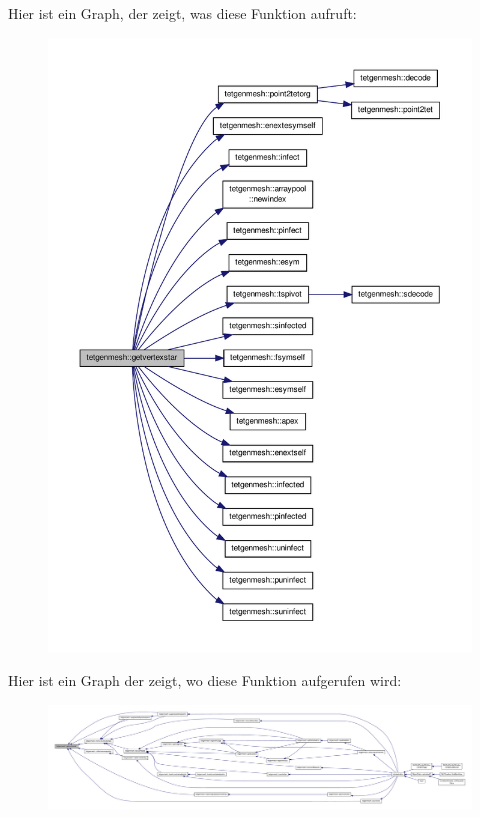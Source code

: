 Hier ist ein Graph, der zeigt, was diese Funktion aufruft\-:\nopagebreak
\begin{figure}[H]
\begin{center}
\leavevmode
\includegraphics[width=350pt]{classtetgenmesh_a9ba3540239e05588c5a2021b15d89a8e_cgraph}
\end{center}
\end{figure}




Hier ist ein Graph der zeigt, wo diese Funktion aufgerufen wird\-:\nopagebreak
\begin{figure}[H]
\begin{center}
\leavevmode
\includegraphics[width=350pt]{classtetgenmesh_a9ba3540239e05588c5a2021b15d89a8e_icgraph}
\end{center}
\end{figure}


